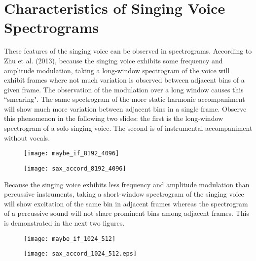\documentclass[10pt]{article}
\begin{document}
\section*{Characteristics of Singing Voice Spectrograms}
These features of the singing voice can be observed in spectrograms. According
to Zhu et al. (2013), because the singing voice exhibits some frequency and
amplitude modulation, taking a long-window spectrogram of the voice will exhibit
frames where not much variation is observed between adjacent bins of a given
frame. The observation of the modulation over a long window causes this
``smearing". The same spectrogram of the more static harmonic accompaniment will
show much more variation between adjacent bins in a single frame. Observe this
phenomenon in the following two slides: the first is the long-window spectrogram
of a solo singing voice. The second is of instrumental accompaniment without
vocals.
\par

\begin{figure}[H]
    \centering
    \texttt{[image: maybe\_if\_8192\_4096]}
\end{figure}

\begin{figure}[H]
    \centering
    \texttt{[image: sax\_accord\_8192\_4096]}
\end{figure}

Because the singing voice exhibits less frequency and amplitude modulation than
percussive instruments, taking a short-window spectrogram of the singing voice
will show excitation of the same bin in adjacent frames whereas the spectrogram
of a percussive sound will not share prominent bins among adjacent frames. This
is demonstrated in the next two figures.
\par

\begin{figure}[H]
    \centering
    \texttt{[image: maybe\_if\_1024\_512]}
\end{figure}

\begin{figure}[H]
    \centering
    \texttt{[image: sax\_accord\_1024\_512.eps]}
\end{figure}
\end{document}
